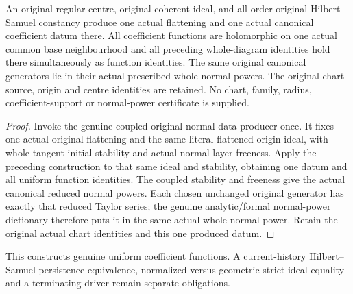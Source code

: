 \begin{theorem}
\label{hir:actual-original-hs-centre-uniform-canonical-functions}
\leanok
An original regular centre, original coherent ideal, and all-order
original Hilbert--Samuel constancy produce one actual flattening and
one actual canonical coefficient datum there. All coefficient functions
are holomorphic on one actual common base neighbourhood and all preceding
whole-diagram identities hold there simultaneously as function identities.
The same original canonical generators lie in their actual prescribed
whole normal powers. The original chart source, origin and centre
identities are retained. No chart, family, radius, coefficient-support
or normal-power certificate is supplied.
\end{theorem}
\begin{proof}
Invoke the genuine coupled original normal-data producer once. It fixes
one actual original flattening and the same literal flattened origin
ideal, with whole tangent initial stability and actual normal-layer
freeness. Apply the preceding construction to that same ideal and
stability, obtaining one datum and all uniform function identities.
The coupled stability and freeness give the actual canonical reduced
normal powers. Each chosen unchanged original generator has exactly
that reduced Taylor series; the genuine analytic/formal normal-power
dictionary therefore puts it in the same actual whole normal power.
Retain the original actual chart identities and this one produced datum.
\end{proof}

This constructs genuine uniform coefficient functions. A current-history
Hilbert--Samuel persistence equivalence, normalized-versus-geometric
strict-ideal equality and a terminating driver remain separate obligations.
